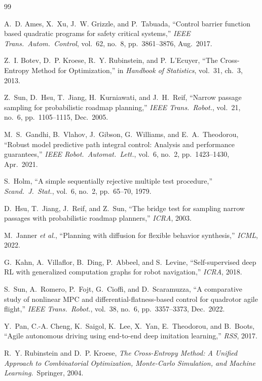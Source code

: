 \documentclass[11pt,onecolumn,a4paper]{article}
\begin{document}
\begin{thebibliography}{99}

A.~D. Ames, X.~Xu, J.~W. Grizzle, and P.~Tabuada, ``Control barrier
function based quadratic programs for safety critical systems,''
\emph{IEEE Trans.\ Autom.\ Control}, vol.~62, no.~8, pp.~3861--3876,
Aug.\ 2017.

Z.~I. Botev, D.~P. Kroese, R.~Y. Rubinstein, and P.~L'Ecuyer, ``The
Cross-Entropy Method for Optimization,'' in \emph{Handbook of
Statistics}, vol.~31, ch.~3, 2013.

Z.~Sun, D.~Hsu, T.~Jiang, H.~Kurniawati, and J.~H.~Reif, ``Narrow
passage sampling for probabilistic roadmap planning,'' \emph{IEEE
Trans.\ Robot.}, vol.~21, no.~6, pp.~1105--1115, Dec.\ 2005.

M.~S.~Gandhi, B.~Vlahov, J.~Gibson, G.~Williams, and
E.~A.~Theodorou, ``Robust model predictive path integral control:
Analysis and performance guarantees,'' \emph{IEEE Robot.\ Automat.\
Lett.}, vol.~6, no.~2, pp.~1423--1430, Apr.\ 2021.

S.~Holm, ``A simple sequentially rejective multiple test procedure,''
\emph{Scand.\ J.\ Stat.}, vol.~6, no.~2, pp.~65--70, 1979.

D.~Hsu, T.~Jiang, J.~Reif, and Z.~Sun, ``The bridge test for sampling
narrow passages with probabilistic roadmap planners,'' \emph{ICRA},
2003.

M.~Janner \emph{et al.}, ``Planning with diffusion for flexible
behavior synthesis,'' \emph{ICML}, 2022.

G.~Kahn, A.~Villaflor, B.~Ding, P.~Abbeel, and S.~Levine,
``Self-supervised deep RL with generalized computation graphs for
robot navigation,'' \emph{ICRA}, 2018.

S.~Sun, A.~Romero, P.~Fojt, G.~Cioffi, and D.~Scaramuzza, ``A
comparative study of nonlinear MPC and differential-flatness-based
control for quadrotor agile flight,'' \emph{IEEE Trans.\ Robot.},
vol.~38, no.~6, pp.~3357--3373, Dec.\ 2022.

Y.~Pan, C.-A. Cheng, K.~Saigol, K.~Lee, X.~Yan, E.~Theodorou, and
B.~Boots, ``Agile autonomous driving using end-to-end deep imitation
learning,'' \emph{RSS}, 2017.

R.~Y. Rubinstein and D.~P. Kroese, \emph{The Cross-Entropy Method: A
Unified Approach to Combinatorial Optimization, Monte-Carlo
Simulation, and Machine Learning.}\ Springer, 2004.


\end{thebibliography}
\end{document}
